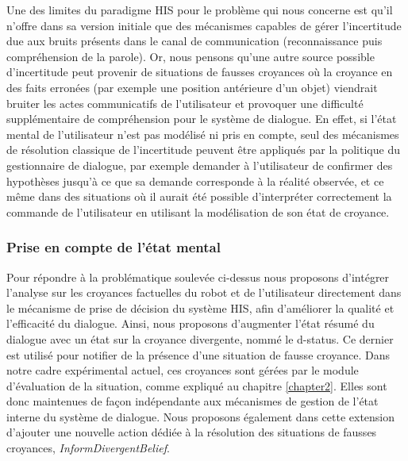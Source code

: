 \documentclass[a4paper,11pt,twoside]{StyleThese}
\begin{document}
Une des limites du paradigme HIS pour le problème qui nous concerne est qu’il
n’offre dans sa version initiale que des mécanismes capables de gérer l’incertitude due aux bruits présents dans le canal de communication (reconnaissance puis compréhension
de la parole). 
Or, nous pensons qu’une autre source possible d'incertitude peut
provenir de situations de fausses croyances où la croyance en des faits erronées (par exemple une position antérieure d’un objet) viendrait bruiter les actes  communicatifs
de l’utilisateur et provoquer une difficulté supplémentaire de compréhension pour le système de dialogue. En effet, si l’état mental de l’utilisateur n’est pas modélisé ni pris en compte, seul des mécanismes de résolution classique de l’incertitude peuvent être appliqués par la politique du gestionnaire de dialogue, par exemple demander à l’utilisateur de confirmer des hypothèses
jusqu’à ce que sa demande corresponde à la réalité observée, et ce même dans
des situations où il aurait été possible d'interpréter correctement la commande de l'utilisateur en utilisant la modélisation de son état de croyance.




\subsubsection{Prise en compte de l'état mental}
\label{sec:mentalStateDial}
Pour répondre à la problématique soulevée ci-dessus nous proposons d'intégrer l’analyse sur les
croyances factuelles du robot et de l’utilisateur directement dans le mécanisme de prise
de décision du système HIS, afin d'améliorer la qualité et l’efficacité du dialogue. Ainsi, nous proposons d’augmenter l’état résumé du dialogue avec un état sur la croyance divergente, nommé le
d-status. Ce dernier est utilisé pour notifier de la présence d’une situation de fausse croyance.
Dans notre cadre expérimental actuel, ces croyances sont gérées par le module d'évaluation de la situation, comme expliqué au chapitre \ref{chapter2}. Elles sont donc maintenues de façon indépendante aux mécanismes de gestion de l’état interne du système de dialogue. Nous proposons également dans cette extension d’ajouter une nouvelle action dédiée à la résolution des situations de fausses croyances, \textit{InformDivergentBelief}.
\end{document}
